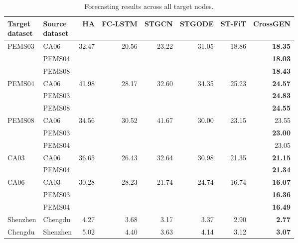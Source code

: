 \documentclass[runningheads,a4paper]{llncs}
\begin{document}
\begin{table}[t]
\centering
\caption{Forecasting results across all target nodes.}
\label{tab:main-results}
\footnotesize
\setlength{\tabcolsep}{2.2pt}
\begin{tabular}{@{}llrrrr@{\hspace{9pt}}rr@{}}
\hline

\shortstack[l]{Target\\dataset} & \shortstack[l]{Source\\dataset} &
HA & FC-LSTM & STGCN & STGODE & ST-FiT & CrossGEN \\
\hline
\multirow{3}{*}{PEMS03} & CA06 &
  \multirow{3}{*}{32.47} & \multirow{3}{*}{20.56} &
  \multirow{3}{*}{23.22} & \multirow{3}{*}{31.05} &
  \multirow{3}{*}{18.86} & \textbf{18.35} \\
 & PEMS04 & & & & & & \textbf{18.03} \\
 & PEMS08 & & & & & & \textbf{18.43} \\[3pt]
\multirow{3}{*}{PEMS04} & CA06 &
  \multirow{3}{*}{41.98} & \multirow{3}{*}{28.17} &
  \multirow{3}{*}{32.60} & \multirow{3}{*}{34.35} &
  \multirow{3}{*}{25.23} & \textbf{24.57} \\
 & PEMS03 & & & & & & \textbf{24.83} \\
 & PEMS08 & & & & & & \textbf{24.55} \\[3pt]
\multirow{3}{*}{PEMS08} & CA06 &
  \multirow{3}{*}{34.56} & \multirow{3}{*}{30.52} &
  \multirow{3}{*}{41.67} & \multirow{3}{*}{30.00} &
  \multirow{3}{*}{23.15} & 23.55 \\
 & PEMS03 & & & & & & \textbf{23.00} \\
 & PEMS04 & & & & & & 23.05 \\[3pt]
\multirow{2}{*}{CA03} & CA06 &
  \multirow{2}{*}{36.65} & \multirow{2}{*}{26.43} &
  \multirow{2}{*}{32.64} & \multirow{2}{*}{30.98} &
  \multirow{2}{*}{21.35} & \textbf{21.15} \\
 & PEMS04 & & & & & & \textbf{21.34} \\[3pt]
\multirow{3}{*}{CA06} & CA03 &
  \multirow{3}{*}{30.28} & \multirow{3}{*}{28.23} &
  \multirow{3}{*}{21.74} & \multirow{3}{*}{24.74} &
  \multirow{3}{*}{16.74} & \textbf{16.07} \\
 & PEMS03 & & & & & & \textbf{16.36} \\
 & PEMS04 & & & & & & \textbf{16.49} \\
\hline
Shenzhen & Chengdu & 4.27 & 3.68 & 3.17 & 3.37 & 2.90 & \textbf{2.77} \\
Chengdu & Shenzhen & 5.02 & 4.40 & 3.63 & 4.14 & 3.12 & \textbf{3.07} \\
\hline
\end{tabular}\par
\end{table}
\end{document}
